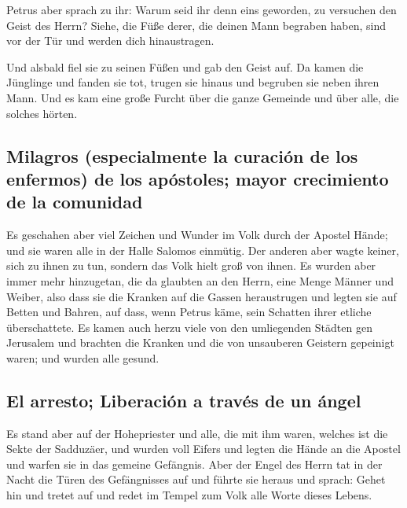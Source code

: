  Petrus aber sprach zu ihr: Warum seid ihr denn eins
geworden, zu versuchen den Geist des Herrn? Siehe, die Füße derer, die
deinen Mann begraben haben, sind vor der Tür und werden dich
hinaustragen.

 Und alsbald fiel sie zu seinen Füßen und gab den Geist
auf. Da kamen die Jünglinge und fanden sie tot, trugen sie hinaus und
begruben sie neben ihren Mann.  Und es kam eine große
Furcht über die ganze Gemeinde und über alle, die solches hörten.

\hypertarget{milagros-especialmente-la-curaciuxf3n-de-los-enfermos-de-los-apuxf3stoles-mayor-crecimiento-de-la-comunidad}{%
\subsection{Milagros (especialmente la curación de los enfermos) de los
apóstoles; mayor crecimiento de la
comunidad}\label{milagros-especialmente-la-curaciuxf3n-de-los-enfermos-de-los-apuxf3stoles-mayor-crecimiento-de-la-comunidad}}

 Es geschahen aber viel Zeichen und Wunder im Volk durch
der Apostel Hände; und sie waren alle in der Halle Salomos einmütig.
 Der anderen aber wagte keiner, sich zu ihnen zu tun,
sondern das Volk hielt groß von ihnen.  Es wurden aber
immer mehr hinzugetan, die da glaubten an den Herrn, eine Menge Männer
und Weiber,  also dass sie die Kranken auf die Gassen
heraustrugen und legten sie auf Betten und Bahren, auf dass, wenn Petrus
käme, sein Schatten ihrer etliche überschattete.  Es
kamen auch herzu viele von den umliegenden Städten gen Jerusalem und
brachten die Kranken und die von unsauberen Geistern gepeinigt waren;
und wurden alle gesund.

\hypertarget{el-arresto-liberaciuxf3n-a-travuxe9s-de-un-uxe1ngel}{%
\subsection{El arresto; Liberación a través de un
ángel}\label{el-arresto-liberaciuxf3n-a-travuxe9s-de-un-uxe1ngel}}

 Es stand aber auf der Hohepriester und alle, die mit ihm
waren, welches ist die Sekte der Sadduzäer, und wurden voll Eifers
 und legten die Hände an die Apostel und warfen sie in
das gemeine Gefängnis.  Aber der Engel des Herrn tat in
der Nacht die Türen des Gefängnisses auf und führte sie heraus und
sprach:  Gehet hin und tretet auf und redet im Tempel zum
Volk alle Worte dieses Lebens.

